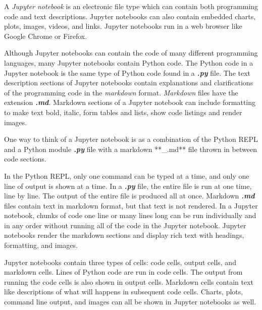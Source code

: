 \documentclass{book}
\begin{document}
    
        A \emph{Jupyter notebook} is an electronic file type which can contain
both programming code and text descriptions. Jupyter notebooks can also
contain embedded charts, plots, images, videos, and links. Jupyter
notebooks run in a web browser like Google Chrome or Firefox.
    




    
        Although Jupyter notebooks can contain the code of many different
programming languages, many Jupyter notebooks contain Python code. The
Python code in a Jupyter notebook is the same type of Python code found
in a \textbf{\emph{.py}} file. The text description sections of Jupyter
notebooks contain explanations and clarifications of the programming
code in the \emph{markdown} format. \emph{Markdown} files have the
extension \textbf{\emph{.md}}. Markdown sections of a Jupyter notebook
can include formatting to make text bold, italic, form tables and lists,
show code listings and render images.
    




    
        One way to think of a Jupyter notebook is as a combination of the Python
REPL and a Python module \textbf{\emph{.py}} file with a markdown
**\_.md** file thrown in between code sections.

In the Python REPL, only one command can be typed at a time, and only
one line of output is shown at a time. In a \textbf{\emph{.py}} file,
the entire file is run at one time, line by line. The output of the
entire file is produced all at once. Markdown \textbf{\emph{.md}} files
contain text in markdown format, but that text is not rendered. In a
Jupyter notebook, chunks of code one line or many lines long can be run
individually and in any order without running all of the code in the
Jupyter notebook. Jupyter notebooks render the markdown sections and
display rich text with headings, formatting, and images.
    




    
        Jupyter notebooks contain three types of cells: code cells, output
cells, and markdown cells. Lines of Python code are run in code cells.
The output from running the code cells is also shown in output cells.
Markdown cells contain text like descriptions of what will happens in
subsequent code cells. Charts, plots, command line output, and images
can all be shown in Jupyter notebooks as well.
    
\end{document}
